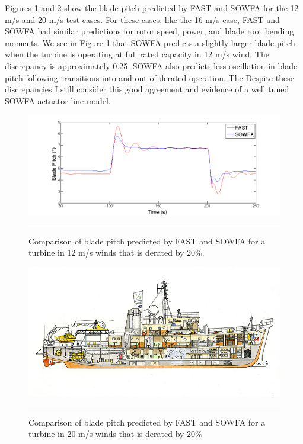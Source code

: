 Figures \ref{fig6-7} and \ref{fig6-8} show the blade pitch predicted by FAST and SOWFA for the  12 m/s and 20 m/s test cases. For these cases, like the 16 m/s case, FAST and SOWFA had similar predictions for rotor speed, power, and blade root bending moments. We see in Figure \ref{fig6-7} that SOWFA predicts a slightly larger blade pitch when the turbine is operating at full rated capacity in 12 m/s wind. The discrepancy is approximately 0.25\degree . SOWFA also predicts less oscillation in blade pitch following transitions into and out of derated operation. The Despite these discrepancies I still consider this good agreement and evidence of a well tuned SOWFA actuator line model.   



\begin{figure}[htbp] \label{fig6-7}
	\centering
		\includegraphics[trim = {1cm 0 2cm 0}, clip, width = \linewidth]{Figures/ch6Figures/fig6-7.png}
		\rule{35em}{0.5pt}
	\caption{Comparison of blade pitch predicted by FAST and SOWFA for a turbine in 12 m/s winds that is derated by 20\%.}
\end{figure}

\begin{figure}[htbp]	\label{fig6-8}
	\centering
		\includegraphics[trim = {1cm 0 2cm 0}, clip, width = \linewidth]{Figures/ch6Figures/fig6-p.png}
		\rule{35em}{0.5pt}
	\caption{Comparison of blade pitch predicted by FAST and SOWFA for a turbine in 20 m/s winds that is derated by 20\%}
\end{figure}

